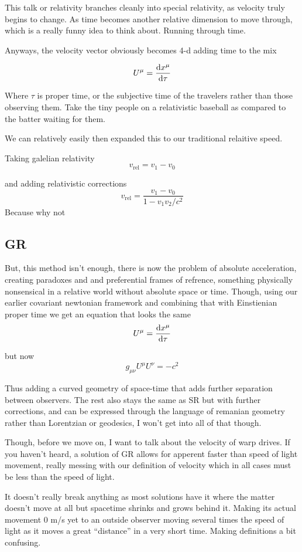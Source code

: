 This talk or relativity branches cleanly into special relativity, as velocity truly begins to change. As time becomes another relative dimension to move through, which is a really funny idea to think about. Running through time.

Anyways, the velocity vector obviously becomes 4-d adding time to the mix

\[
	U^\mu = \dv{x^\mu}{\tau}
\]

Where $\tau$ is proper time, or the subjective time of the travelers rather than those observing them. Take the tiny people on a relativistic baseball as compared to the batter waiting for them.

We can relatively easily then expanded this to our traditional relaitive speed.

Taking galelian relativity
\[
	v_{\text{rel}} = v_1 - v_0
\]

and adding relativistic corrections
\[
	v_{\text{rel}} = \frac{v_1 - v_0}{1 - v_1 v_2 / c^2}
\]
Because why not
\subsection{GR}

But, this method isn't enough, there is now the problem of absolute acceleration, creating paradoxes and and preferential frames of refrence, something physically nonsensical in a relative world without absolute space or time. Though, using our earlier covariant newtonian framework and combining that with Einstienian proper time we get an equation that looks the same
\[
	U^\mu = \dv{x^\mu}{\tau}
\]

but now
\[
	g_{\mu \nu}U^\mu U^\nu = -c^2
\]

Thus adding a curved geometry of space-time that adds further separation between observers. The rest also stays the same as SR but with further corrections, and can be expressed through the language of remanian geometry rather than Lorentzian or geodesics, I won't get into all of that though.

Though, before we move on, I want to talk about the velocity of warp drives. If you haven't heard, a solution of GR allows for apperent faster than speed of light movement, really messing with our definition of velocity which in all cases must be less than the speed of light.

It doesn't really break anything as most solutions have it where the matter doesn't move at all but spacetime shrinks and grows behind it. Making its actual movement 0 m/s yet to an outside observer moving several times the speed of light as it moves a great ``distance'' in a very short time. Making definitions a bit confusing.

